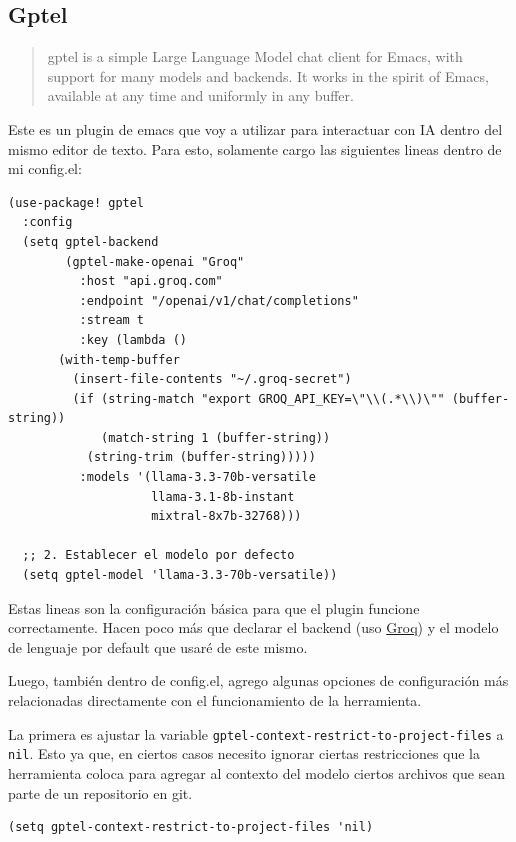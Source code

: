 \documentclass[11pt]{article}
\begin{document}
\subsection{Gptel}
\label{sec:org9241165}

\begin{quote}
gptel is a simple Large Language Model chat client for Emacs, with support for many models and backends. It works in the spirit of Emacs, available at any time and uniformly in any buffer. 
\end{quote}

Este es un plugin de emacs que voy a utilizar para interactuar con IA dentro del mismo editor de texto. Para esto, solamente cargo las siguientes lineas dentro de mi config.el:

\begin{verbatim}
(use-package! gptel
  :config
  (setq gptel-backend
        (gptel-make-openai "Groq"
          :host "api.groq.com"
          :endpoint "/openai/v1/chat/completions"
          :stream t
          :key (lambda () 
       (with-temp-buffer
         (insert-file-contents "~/.groq-secret")
         (if (string-match "export GROQ_API_KEY=\"\\(.*\\)\"" (buffer-string))
             (match-string 1 (buffer-string))
           (string-trim (buffer-string)))))
          :models '(llama-3.3-70b-versatile
                    llama-3.1-8b-instant
                    mixtral-8x7b-32768)))

  ;; 2. Establecer el modelo por defecto
  (setq gptel-model 'llama-3.3-70b-versatile))
\end{verbatim}

Estas lineas son la configuración básica para que el plugin funcione correctamente. Hacen poco más que declarar el backend (uso \href{https://groq.com/}{Groq}) y el modelo de lenguaje por default que usaré de este mismo.

Luego, también dentro de config.el, agrego algunas opciones de configuración más relacionadas directamente con el funcionamiento de la herramienta.

La primera es ajustar la variable \texttt{gptel-context-restrict-to-project-files} a \texttt{nil}. Esto ya que, en ciertos casos necesito ignorar ciertas restricciones que la herramienta coloca para agregar al contexto del modelo ciertos archivos que sean parte de un repositorio en git.

\begin{verbatim}
(setq gptel-context-restrict-to-project-files 'nil)
\end{verbatim}
\end{document}

